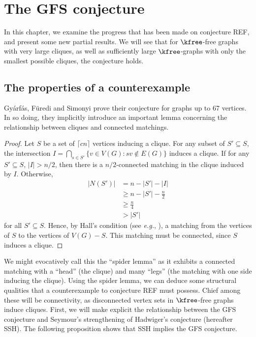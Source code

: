 \chapter{The GFS conjecture}

In this chapter, we examine the progress that has been made on conjecture REF, and present some new partial results.  We will see that for $\kfree$-free graphs with very large cliques, as well as sufficiently large $\kfree$-graphs with only the smallest possible cliques, the conjecture holds.

\section{The properties of a counterexample}

Gy\'{a}rf\'{a}s, F\"{u}redi and Simonyi prove their conjecture for graphs up to 67 vertices.  In so doing, they implicitly introduce an important lemma concerning the relationship between cliques and connected matchings.  

\begin{proof}
	Let $S$ be a set of $\lceil cn\rceil$ vertices inducing a clique.  For any subset of $S'\subseteq S$, the intersection $\displaystyle I = \bigcap_{s\in S'} \{v \in V(G): sv \notin E(G)\}$ induces a clique.  If for any $S'\subseteq S$, $|I| > n/2$, then there is a $n/2$-connected matching in the clique induced by $I$.  Otherwise, 
\begin{align*}
|N(S')| &= n- |S'| - |I|\\
	&\geq n - |S'| - \frac{n}{2}\\
	&\geq \frac{n}{4} \\
	&> |S'| 
\end{align*} for all $S'\subseteq S$.  Hence, by Hall's condition (see {\it e.g.}, \cite{West}),  a matching from the vertices of $S$ to the vertices of $V(G)-S$.  This matching must be connected, since $S$ induces a clique.
\end{proof}

We might evocatively call this the ``spider lemma'' as it exhibits a connected matching with a ``head'' (the clique) and many ``legs'' (the matching with one side inducing the clique).  Using the spider lemma, we can deduce some structural qualities that a counterexample to conjecture REF must possess.  Chief among these will be connectivity, as disconnected vertex sets in $\kfree$-free graphs induce cliques.  First, we will make explicit the relationship between the GFS conjecture and Seymour's strengthening of Hadwiger's conjecture (hereafter SSH).  The following proposition shows that SSH implies the GFS conjecture.  

